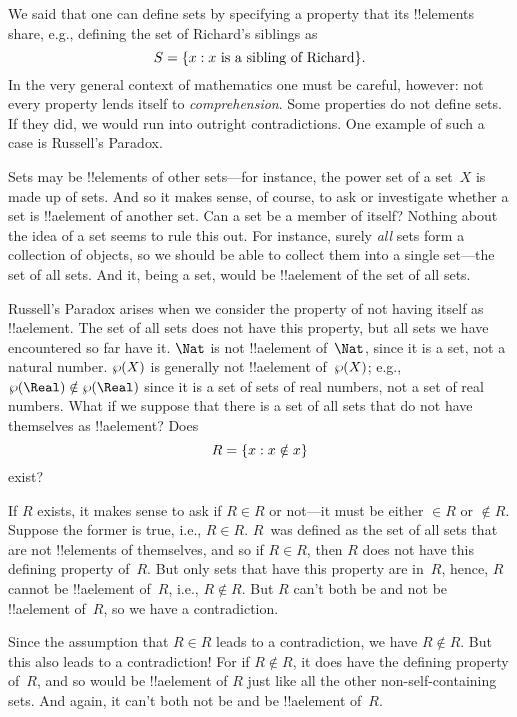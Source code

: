 \documentclass[../../../include/open-logic-section]{subfiles}
\begin{document}

We said that one can define sets by specifying a property that its
!!{element}s share, e.g., defining the set of Richard's siblings as
\[
S = \{ x : x \text{ is a sibling of Richard} \}.
\]
In the very general context of mathematics one must be careful,
however: not every property lends itself to \emph{comprehension}. Some
properties do not define sets.  If they did, we would run into
outright contradictions. One example of such a case is Russell's
Paradox.

Sets may be !!{element}s of other sets---for instance, the power set
of a set~$X$ is made up of sets.  And so it makes sense, of course, to
ask or investigate whether a set is !!a{element} of another set.  Can
a set be a member of itself?  Nothing about the idea of a set seems to
rule this out. For instance, surely \emph{all} sets form a collection
of objects, so we should be able to collect them into a single
set---the set of all sets. And it, being a set, would be !!a{element}
of the set of all sets.

Russell's Paradox arises when we consider the property of not having
itself as !!a{element}.  The set of all sets does not have this
property, but all sets we have encountered so far have it. $\Nat$ is
not !!a{element} of~$\Nat$, since it is a set, not a natural
number. $\wp(X)$ is generally not !!a{element} of~$\wp(X)$; e.g.,
$\Pow{\Real} \notin \Pow{\Real}$ since it is a set of sets of real
numbers, not a set of real numbers.  What if we suppose that there is
a set of all sets that do not have themselves as !!a{element}? Does
\[
R = \{ x : x \notin x \}
\]
exist?

If $R$ exists, it makes sense to ask if $R \in R$ or not---it must be
either $\in R$ or $\notin R$. Suppose the former is true, i.e., $R \in
R$. $R$~was defined as the set of all sets that are not !!{element}s
of themselves, and so if $R \in R$, then $R$ does not have this
defining property of~$R$. But only sets that have this property are
in~$R$, hence, $R$ cannot be !!a{element} of~$R$, i.e., $R \notin
R$. But $R$ can't both be and not be !!a{element} of~$R$, so we have a
contradiction.

Since the assumption that $R \in R$ leads to a contradiction, we have
$R \notin R$. But this also leads to a contradiction!{} For if $R
\notin R$, it does have the defining property of~$R$, and so would be
!!a{element} of $R$ just like all the other non-self-containing sets.
And again, it can't both not be and be !!a{element} of~$R$.
\end{document}
